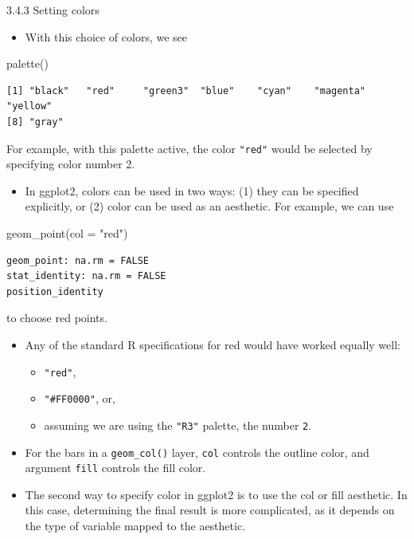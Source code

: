 \documentclass[
  9pt,
  a4paper,
  ignorenonframetext,
  notheorems]{beamer}
\newenvironment{Shaded}{\begin{snugshade}}{\end{snugshade}}
\newcommand{\AttributeTok}[1]{\textcolor[rgb]{0.40,0.45,0.13}{#1}}
\newcommand{\FunctionTok}[1]{\textcolor[rgb]{0.28,0.35,0.67}{#1}}
\newcommand{\NormalTok}[1]{\textcolor[rgb]{0.00,0.23,0.31}{#1}}
\newcommand{\StringTok}[1]{\textcolor[rgb]{0.13,0.47,0.30}{#1}}
\providecommand{\tightlist}{%
  \setlength{\itemsep}{0pt}\setlength{\parskip}{0pt}}\usepackage{longtable,booktabs,array}
\begin{document}
\begin{frame}[fragile]
\begin{block}{3.4.3 Setting colors}
\begin{itemize}
\tightlist
\item
  With this choice of colors, we see
\end{itemize}

\begin{Shaded}
\begin{Highlighting}[]
\FunctionTok{palette}\NormalTok{()}
\end{Highlighting}
\end{Shaded}

\begin{verbatim}
[1] "black"   "red"     "green3"  "blue"    "cyan"    "magenta" "yellow" 
[8] "gray"   
\end{verbatim}

For example, with this palette active, the color \texttt{"red"} would be
selected by specifying color number 2.

\begin{itemize}
\tightlist
\item
  In ggplot2, colors can be used in two ways: (1) they can be specified
  explicitly, or (2) color can be used as an aesthetic. For example, we
  can use
\end{itemize}

\begin{Shaded}
\begin{Highlighting}[]
\FunctionTok{geom\_point}\NormalTok{(}\AttributeTok{col =} \StringTok{"red"}\NormalTok{)}
\end{Highlighting}
\end{Shaded}

\begin{verbatim}
geom_point: na.rm = FALSE
stat_identity: na.rm = FALSE
position_identity 
\end{verbatim}

to choose red points.

\begin{itemize}
\item
  Any of the standard R specifications for red would have worked equally
  well:

  \begin{itemize}
  \tightlist
  \item
    \texttt{"red"},
  \item
    \texttt{"\#FF0000"}, or,
  \item
    assuming we are using the \texttt{"R3"} palette, the number
    \texttt{2}.
  \end{itemize}
\item
  For the bars in a \texttt{geom\_col()} layer, \texttt{col} controls
  the outline color, and argument \texttt{fill} controls the fill color.
\item
  The second way to specify color in ggplot2 is to use the col or fill
  aesthetic. In this case, determining the final result is more
  complicated, as it depends on the type of variable mapped to the
  aesthetic.
\end{itemize}
\end{block}
\end{frame}
\end{document}
